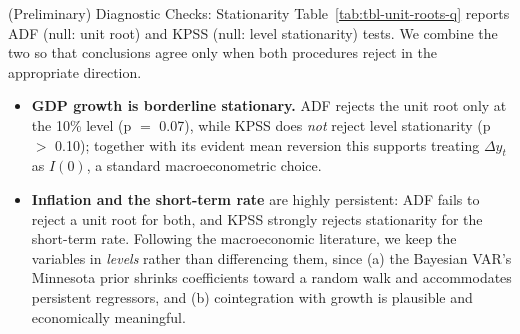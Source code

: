 \documentclass[9pt]{beamer}
\begin{document}
\begin{frame}{(Preliminary) Diagnostic Checks: Stationarity}
\label{slide:stationarity}
\footnotesize
Table~\ref{tab:tbl-unit-roots-q} reports ADF (null: unit root) and KPSS (null: level stationarity) tests. We combine the two so that conclusions agree only when both procedures reject in the appropriate direction.

{\footnotesize
\setlength{\tabcolsep}{5pt}

}

\footnotesize
\begin{itemize}
  \item \textbf{GDP growth is borderline stationary.} ADF rejects the unit root only at the 10\% level (p $=$ 0.07), while KPSS does \emph{not} reject level stationarity (p $>$ 0.10); together with its evident mean reversion this supports treating $\Delta y_t$ as $I(0)$, a standard macroeconometric choice.

  \item \textbf{Inflation and the short-term rate} are highly persistent: ADF fails to reject a unit root for both, and KPSS strongly rejects stationarity for the short-term rate. Following the macroeconomic literature, we keep the variables in \textit{levels} rather than differencing them, since (a) the Bayesian VAR's Minnesota prior shrinks coefficients toward a random walk and accommodates persistent regressors, and (b) cointegration with growth is plausible and economically meaningful.
\end{itemize}

\end{frame}
\end{document}
